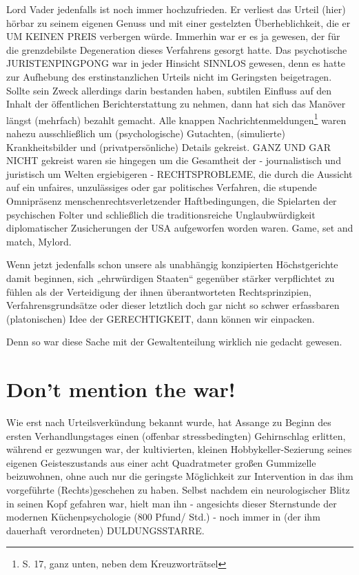\begin{multicols}{2}
Lord Vader jedenfalls ist noch immer hochzufrieden. Er
verliest das Urteil (hier) hörbar zu seinem eigenen Genuss und mit einer gestelzten Überheblichkeit, die er
UM KEINEN PREIS verbergen würde. Immerhin war er
es ja gewesen, der für die grenzdebilste Degeneration
dieses Verfahrens gesorgt hatte. Das psychotische JURISTENPINGPONG war in jeder Hinsicht SINNLOS gewesen, denn es hatte zur Aufhebung des erstinstanzlichen Urteils nicht im Geringsten beigetragen. Sollte sein
Zweck allerdings darin bestanden haben, subtilen Einfluss auf den Inhalt der öffentlichen Berichterstattung
zu nehmen, dann hat sich das Manöver längst (mehrfach) bezahlt gemacht. Alle knappen Nachrichtenmeldungen\footnote[34]{S. 17, ganz unten, neben dem Kreuzworträtsel} waren nahezu ausschließlich um (psychologische) Gutachten, (simulierte) Krankheitsbilder und
(privatpersönliche) Details gekreist. GANZ UND GAR
NICHT gekreist waren sie hingegen um die Gesamtheit
der - journalistisch und juristisch um Welten ergiebigeren - RECHTSPROBLEME, die durch die Aussicht auf ein
unfaires, unzulässiges oder gar politisches Verfahren, die
stupende Omnipräsenz menschenrechtsverletzender
Haftbedingungen, die Spielarten der psychischen Folter
und schließlich die traditionsreiche Unglaubwürdigkeit
diplomatischer Zusicherungen der USA aufgeworfen
worden waren. Game, set and match, Mylord.

Wenn jetzt jedenfalls schon unsere als unabhängig konzipierten Höchstgerichte damit beginnen, sich „ehrwürdigen Staaten“ gegenüber stärker verpflichtet zu fühlen
als der Verteidigung der ihnen überantworteten Rechtsprinzipien, Verfahrensgrundsätze oder dieser letztlich
doch gar nicht so schwer erfassbaren (platonischen)
Idee der GERECHTIGKEIT, dann können wir einpacken.

Denn so war diese Sache mit der Gewaltenteilung wirklich nie gedacht gewesen.


\section{Don’t mention the war!} %
Wie erst nach Urteilsverkündung bekannt wurde, hat Assange zu Beginn des ersten Verhandlungstages einen (offenbar stressbedingten) Gehirnschlag erlitten, während
er gezwungen war, der kultivierten, kleinen Hobbykeller-Sezierung seines eigenen Geisteszustands aus einer
acht Quadratmeter großen Gummizelle beizuwohnen,
ohne auch nur die geringste Möglichkeit zur Intervention in das ihm vorgeführte (Rechts)geschehen zu haben.
Selbst nachdem ein neurologischer Blitz in seinen Kopf
gefahren war, hielt man ihn - angesichts dieser Sternstunde der modernen Küchenpsychologie (800 Pfund/
Std.) - noch immer in (der ihm dauerhaft verordneten)
DULDUNGSSTARRE.


\end{multicols}
